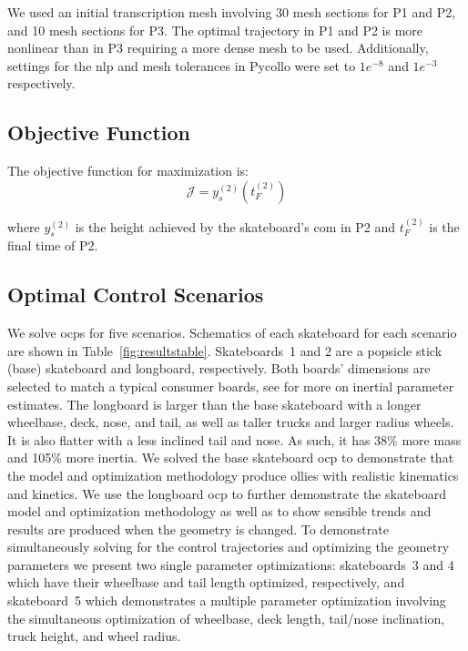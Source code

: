 \documentclass[default,iicol]{sn-jnl}
\begin{document}
We used an initial transcription mesh involving 30 mesh sections for P1 and P2, and 10 mesh sections for P3. The optimal trajectory in P1 and P2 is more nonlinear than in P3 requiring a more dense mesh to be used.
Additionally, settings for the \gls{nlp} and mesh tolerances in Pycollo were set to $1e^{-8}$ and $1e^{-3}$ respectively.

\subsection{Objective Function}

The objective function for maximization is:
%
\begin{equation}
  \mathcal{J} = y_s^{(2)}\left(t_F^{(2)}\right)
\end{equation}

\noindent where $y_s^{(2)}$ is the height achieved by the skateboard's \gls{com} in P2 and $t_F^{(2)}$ is the final time of P2.

\subsection{Optimal Control Scenarios}
%
We solve \glspl{ocp} for five scenarios. Schematics of each skateboard for each scenario are shown in Table~\ref{fig:resultstable}. Skateboards~1 and 2 are a popsicle stick (base) skateboard and longboard, respectively. Both boards' dimensions are selected to match a typical consumer boards, see \cite{heinen_optimal_2022} for more on inertial parameter estimates. 
The longboard is larger than the base skateboard with a longer wheelbase, deck, nose, and tail, as well as taller trucks and larger radius wheels. It is also flatter with a less inclined tail and nose. As such, it has 38\% more mass and 105\% more inertia.
We solved the base skateboard \gls{ocp} to demonstrate that the model and optimization methodology produce ollies with realistic kinematics and kinetics.
We use the longboard \gls{ocp} to further demonstrate the skateboard model and optimization methodology as well as to show sensible trends and results are produced when the geometry is changed.
To demonstrate simultaneously solving for the control trajectories and optimizing the geometry parameters we present two single parameter optimizations: skateboards~3 and 4 which have their wheelbase and tail length optimized, respectively, and skateboard~5 which demonstrates a multiple parameter optimization involving the simultaneous optimization of wheelbase, deck length, tail/nose inclination, truck height, and wheel radius.
\end{document}

